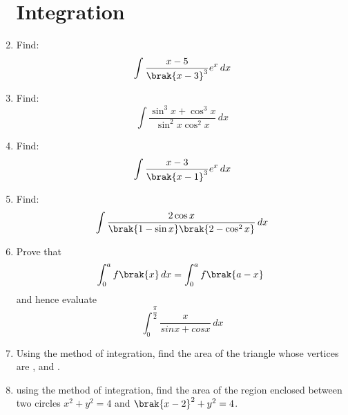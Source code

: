 \begin{enumerate}
\section*{Integration}
\item Find:
\[\int \frac{x-5}{\brak{x-3}^3} e^x \,dx\] 
\item Find:
\[\int \frac{\sin^3{x}+\cos^3{x}}{\sin^2{x}\cos^2{x}} \,dx\]
\item Find:
\[\int \frac{x-3}{\brak{x-1}^3} e^x \, dx\]
\item Find:
  \[ \int \frac{2\cos x}{\brak{1-\sin x}\brak{2-\cos^{2} x}} \,dx \]
\item Prove that\\
\[ \int_{0}^{a} f\brak{x} \,dx = \int_{0}^{a} f\brak{a-x} \ \]
and hence evaluate\\
\[\int_{0}^{\dfrac{\pi}{2}} \frac{x}{sinx + cosx} \,dx\]
\item Using the method of integration, find the area of the triangle whose vertices are ,  and .                                   
\item using the method of integration, find the area of the region enclosed between two circles $ {x}^2 + {y}^2 = 4$ and  $ \brak{x-2}^2 + {y}^2 = 4$.
\end{enumerate}
